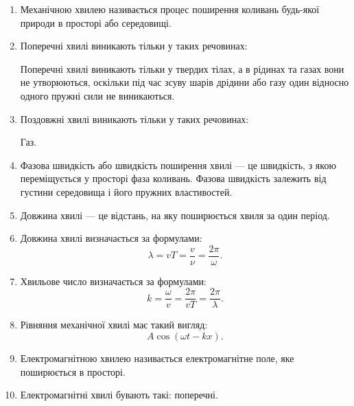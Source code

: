 \documentclass[a4paper,oneside,DIV=10,12pt]{scrartcl}
\begin{document}
	\begin{enumerate}
		\item Механічною хвилею називається процес поширення коливань будь-якої природи в просторі або середовищі.
		\item Поперечні хвилі виникають тільки у таких речовинах:
			
			Поперечні хвилі виникають тільки у твердих тілах, а в рідинах та газах вони не утворюються, оскільки під час зсуву шарів дрідини або газу один відносно одного пружні сили не виникаються.
		\item Поздовжні хвилі виникають тільки у таких речовинах:
			
			Газ.
		\item Фазова швидкість або швидкість поширення хвилі --- це швидкість, з якою переміщується у просторі фаза коливань. Фазова швидкість залежить від густини середовища і його пружних властивостей.
		
		\item Довжина хвилі --- це відстань, на яку поширюється хвиля за один період.
		
		\item Довжина хвилі визначається за формулами:
		\[
			\lambda = vT = \frac{v}{\nu} = \frac{2\pi}{\omega}.
		\]
		
		\item Хвильове число визначається за формулами:
		\[
			k = \frac{\omega}{v} = \frac{2\pi}{vT} = \frac{2\pi}{\lambda}.
		\]
		
		\item Рівняння механічної хвилі має такий вигляд:
		\[
			A\cos\left(\omega t - kx\right).
		\]
		
		\item Електромагнітною хвилею називається електромагнітне поле, яке поширюється в просторі.
		
		\item Електромагнітні хвилі бувають такі: поперечні.
	\end{enumerate}
\end{document}
